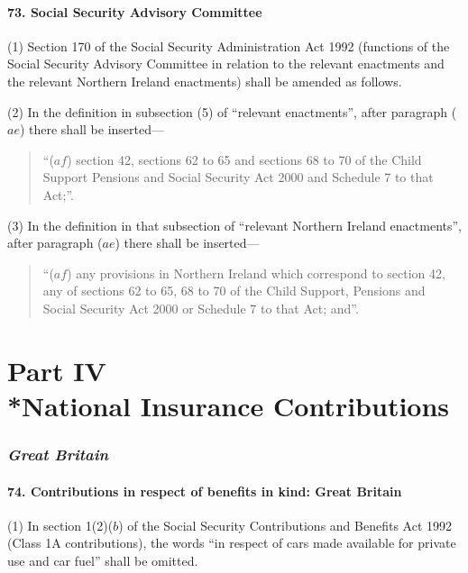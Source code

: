 \documentclass[12pt,a4paper]{article}
\begin{document}
\subsection{73. Social Security Advisory Committee}

(1) Section 170 of the Social Security Administration Act 1992 (functions of the Social Security Advisory Committee in relation to the relevant enactments and the relevant Northern Ireland enactments) shall be amended as follows.

(2) In the definition in subsection (5)  of “relevant enactments”, after paragraph ($ae$)  there shall be inserted—
\begin{quotation}
“($af$) section 42, sections 62 to 65 and sections 68 to 70 of the Child Support Pensions and Social Security Act 2000 and Schedule 7 to that Act;”.
\end{quotation}

(3) In the definition in that subsection of “relevant Northern Ireland enactments”, after paragraph ($ae$)  there shall be inserted—

\begin{quotation}
“($af$) any provisions in Northern Ireland which correspond to section 42, any of sections 62 to 65, 68 to 70 of the Child Support, Pensions and Social Security Act 2000 or Schedule 7 to that Act; and”.
\end{quotation}


\part[Part IV --- National Insurance Contributions]{Part IV\\*National Insurance Contributions}

\renewcommand\parthead{--- Part IV}

\section{\itshape Great Britain}

\subsection{74. Contributions in respect of benefits in kind: Great Britain}

(1) In section 1(2)($b$)  of the Social Security Contributions and Benefits Act 1992 (Class 1A contributions), the words “in respect of cars made available for private use and car fuel” shall be omitted.
\end{document}
